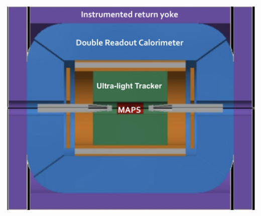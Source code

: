 \documentclass[aspectratio=169, hyperref={colorlinks=true,pdfpagelabels=false,linkcolor=black}, xcolor=dvipsnames,10pt]{beamer}
\begin{document}
\begin{frame}
\begin{columns}
	\vspace{-2cm}
	\centering
	\includegraphics[width=\textwidth]{../figures/FCCeeIDEAConcept.png}
	\end{columns}

\end{frame}
\end{document}
